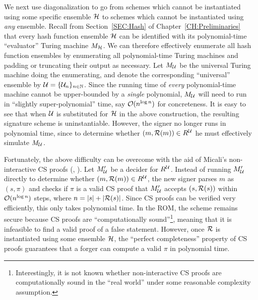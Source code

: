 We next use diagonalization to go from schemes which cannot be instantiated
using some specific ensemble $\mathcal{H}$ to schemes which cannot be instantiated
using {\it any} ensemble. Recall from Section~\ref{SEC:Hash} of
Chapter~\ref{CH:Preliminaries} that every hash function ensemble $\mathcal{H}$ can
be identified with its polynomial-time ``evaluator'' Turing machine $M_{\mathcal{H}}$. 
We can therefore effectively enumerate all hash function ensembles by
enumerating all polynomial-time Turing machines and padding or truncating
their output as necessary. Let $M_{\mathcal{U}}$ be the universal Turing machine doing
the enumerating, and denote the corresponding ``universal'' ensemble by $\mathcal{U}
= \{\mathcal{U}_n\}_{n \in \mathbb{N}}$. Since the running time of {\it every} polynomial-time
machine cannot be upper-bounded by a {\it single} polynomial, $M_{\mathcal{U}}$ will
need to run in ``slightly super-polynomial'' time, say 
$\mathcal{O}(n^{\log n})$ for concreteness.
It is easy to see that when $\mathcal{U}$ is substituted for $\mathcal{H}$ in the above
construction, the resulting signature scheme is uninstantiable.  However, the
signer no longer runs in polynomial time, since to determine whether
$(m,\mathcal{R}(m)) \in R^{\mathcal{U}}$ he must effectively simulate $M_{\mathcal{U}}$. 

Fortunately, the above difficulty can be overcome with the aid of Micali's
non-interactive CS proofs (\cite{micali:csproofs2}, \cite{micali:csproofs1}).
Let $M_{\mathcal{U}}'$ be a decider for $R^{\mathcal{U}}$.
Instead of running $M_{\mathcal{U}}'$ directly to determine whether $(m,\mathcal{R}(m)) \in
R^{\mathcal{U}}$, the new signer parses $m$ as $(s,\pi)$ and checks if $\pi$ is a
valid CS proof that $M_{\mathcal{U}}'$ accepts $(s,\mathcal{R}(s))$ within $\mathcal{O}(n^{\log
n})$ steps, where $n = |s| + |\mathcal{R}(s)|$. Since CS proofs can be verified very
efficiently, this only takes polynomial time. In the ROM, the scheme remains
secure because CS proofs are ``computationally sound''\footnote{Interestingly,
it is not known whether non-interactive CS proofs are computationally sound in
the ``real world'' under some reasonable complexity assumption.}, meaning that
it is infeasible to find a valid proof of a false statement. However, once
$\mathcal{R}$ is instantiated using some ensemble $\mathcal{H}$, the ``perfect
completeness'' property of CS proofs guarantees that a forger can compute a
valid $\pi$ in polynomial time.

